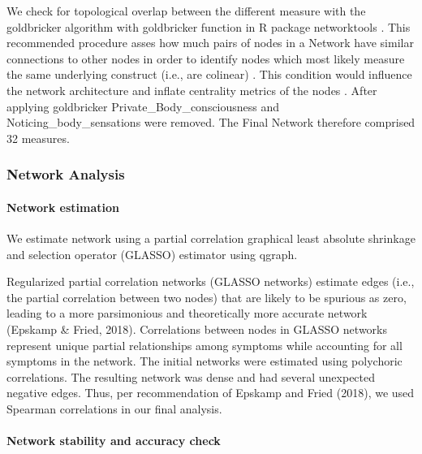 \documentclass[preprint, 3p,
authoryear]{elsarticle} %
\begin{document}
We check for topological overlap between the different measure with the
goldbricker algorithm with goldbricker function in R package
networktools \citep{jones_networktools_2017}. This recommended procedure
\citep{tomei_network_2022, monteleone_systematic_2021} asses how much
pairs of nodes in a Network have similar connections to other nodes in
order to identify nodes which most likely measure the same underlying
construct (i.e., are colinear) \citep{jones_networktools_2017}. This
condition would influence the network architecture and inflate
centrality metrics of the nodes \citep{mcnally_network_2021}. After
applying goldbricker Private\_Body\_consciousness and
Noticing\_body\_sensations were removed. The Final Network therefore
comprised 32 measures.

\hypertarget{network-analysis}{%
\subsubsection{Network Analysis}\label{network-analysis}}

\hypertarget{network-estimation}{%
\paragraph{Network estimation}\label{network-estimation}}

We estimate network using a partial correlation graphical least absolute
shrinkage and selection operator (GLASSO) estimator using qgraph.

Regularized partial correlation networks (GLASSO networks) estimate
edges (i.e., the partial correlation between two nodes) that are likely
to be spurious as zero, leading to a more parsimonious and theoretically
more accurate network (Epskamp \& Fried, 2018). Correlations between
nodes in GLASSO networks represent unique partial relationships among
symptoms while accounting for all symptoms in the network. The initial
networks were estimated using polychoric correlations. The resulting
network was dense and had several unexpected negative edges. Thus, per
recommendation of Epskamp and Fried (2018), we used Spearman
correlations in our final analysis.

\hypertarget{network-stability-and-accuracy-check}{%
\paragraph{Network stability and accuracy
check}\label{network-stability-and-accuracy-check}}
\end{document}

